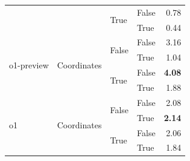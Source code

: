 \begin{tabular}{@{}llllr@{}}
                                                                        &                                   & \multirow[c]{2}{*}{True}  & False                     & 0.78 \\
                                                                        &                                   &                           & True                      & 0.44 \\
    \midrule                                
    \multirow[c]{4}{*}{o1-preview}                                      & \multirow[c]{4}{*}{Coordinates}   & \multirow[c]{2}{*}{False} & False                     & 3.16 \\
                                                                        &                                   &                           & True                      & 1.04 \\
                                                                        &                                   & \multirow[c]{2}{*}{True}  & False                     & \textbf{4.08} \\
                                                                        &                                   &                           & True                      & 1.88 \\
    \midrule                                
    \multirow[c]{4}{*}{o1}                                              & \multirow[c]{4}{*}{Coordinates}   & \multirow[c]{2}{*}{False} & False                     & 2.08 \\
                                                                        &                                   &                           & True                      & \textbf{2.14} \\
                                                                        &                                   & \multirow[c]{2}{*}{True}  & False                     & 2.06 \\
                                                                        &                                   &                           & True                      & 1.84 \\
   \bottomrule
\end{tabular}
